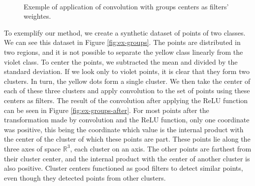 \documentclass[a4paper,conference]{IEEEtran}
\begin{document}
\begin{figure}[!t]
  \centering
  ~
  \caption{Exemple of application of convolution with groups centers as filters' weightes.}
  \label{fig:filter}
\end{figure}

To exemplify our method, we create a synthetic dataset of points of two classes. We can see this dataset in Figure \ref{fig:ex-groups}. The points are distributed in two regions, and it is not possible to separate the yellow class linearly from the violet class. To center the points,  we subtracted the mean and divided by the standard deviation. If we look only to violet points, it is clear that they form two clusters. In turn, the yellow dots form a single cluster. We then take the center of each of these three clusters and apply convolution to the set of points using these centers as filters. The result of the convolution after applying the ReLU function can be seen in Figure \ref{fig:ex-groups-after}. For most points after the transformation made by convolution and the ReLU function, only one coordinate was positive, this being the coordinate which value is the internal product with the center of the cluster of which these points are part. These points lie along the three axes of space $\mathbb{R}^3$, each cluster on an axis. The other points are farthest from their cluster center, and the internal product with the center of another cluster is also positive. Cluster centers functioned as good filters to detect similar points, even though they detected points from other clusters.
\end{document}
